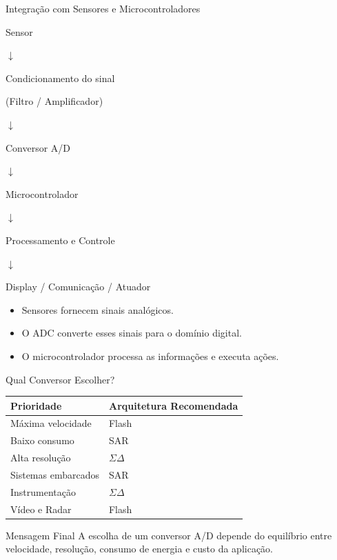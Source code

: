 \documentclass{beamer}
\begin{document}
\begin{frame}{Integração com Sensores e Microcontroladores}
	
	\begin{center}
		
		\Large
		
		Sensor
		
		$\downarrow$
		
		Condicionamento do sinal
		
		(Filtro / Amplificador)
		
		$\downarrow$
		
		Conversor A/D
		
		$\downarrow$
		
		Microcontrolador
		
		$\downarrow$
		
		Processamento e Controle
		
		$\downarrow$
		
		Display / Comunicação / Atuador
		
	\end{center}
	
	\vspace{0.4cm}
	
	\begin{itemize}
		\item Sensores fornecem sinais analógicos.
		\item O ADC converte esses sinais para o domínio digital.
		\item O microcontrolador processa as informações e executa ações.
	\end{itemize}
	
\end{frame}

\begin{frame}{Qual Conversor Escolher?}
	
	\begin{table}
		\centering
		\begin{tabular}{ll}
			\toprule
			\textbf{Prioridade} & \textbf{Arquitetura Recomendada} \\
			\midrule
			Máxima velocidade & Flash \\
			Baixo consumo & SAR \\
			Alta resolução & $\Sigma\Delta$ \\
			Sistemas embarcados & SAR \\
			Instrumentação & $\Sigma\Delta$ \\
			Vídeo e Radar & Flash \\
			\bottomrule
		\end{tabular}
	\end{table}
	
	\vspace{0.5cm}
	
	\begin{block}{Mensagem Final}
		A escolha de um conversor A/D depende do equilíbrio entre velocidade, resolução, consumo de energia e custo da aplicação.
	\end{block}
	
\end{frame}
\end{document}
